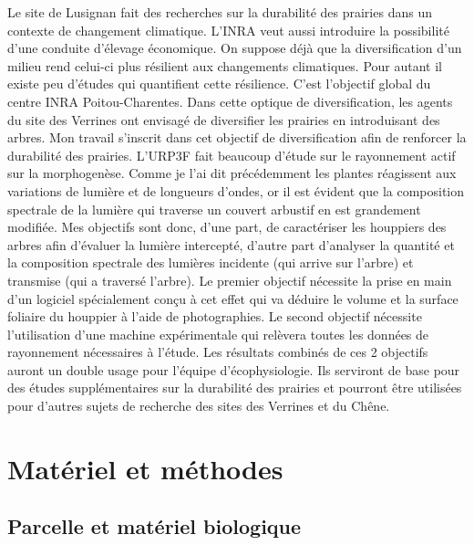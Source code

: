 ﻿\documentclass[12pt]{report}
\begin{document}
Le site de Lusignan fait des recherches sur la durabilité des prairies dans un contexte de changement climatique. L'INRA veut
aussi introduire la possibilité d'une conduite d'élevage économique. On suppose déjà que la diversification d'un milieu rend
celui-ci plus résilient aux changements climatiques. Pour autant il existe peu d'études qui quantifient cette résilience. C'est
l'objectif global du centre INRA Poitou-Charentes. Dans cette optique de diversification, les agents du site des Verrines ont
envisagé de diversifier les prairies en introduisant des arbres. Mon travail s'inscrit dans cet objectif de diversification afin
de renforcer la durabilité des prairies. L'URP3F fait beaucoup d'étude sur le rayonnement actif sur la morphogenèse. Comme je l'ai
dit précédemment les plantes réagissent aux variations de lumière et de longueurs d'ondes, or il est évident que la
composition spectrale de la lumière qui traverse un couvert arbustif en est grandement modifiée. Mes objectifs sont donc, d'une
part, de caractériser les houppiers des arbres afin d'évaluer la lumière intercepté, d'autre part d'analyser la quantité et la composition spectrale des lumières
incidente (qui arrive sur l'arbre) et transmise (qui a traversé l'arbre). Le premier objectif nécessite la prise en main
d'un logiciel spécialement conçu à cet effet qui va déduire le volume et la surface foliaire du houppier à l'aide de photographies.
Le second objectif nécessite l'utilisation d'une machine expérimentale qui
relèvera toutes les données de rayonnement nécessaires à l'étude. Les résultats
combinés de ces 2 objectifs auront un double usage pour l'équipe d'écophysiologie.
Ils serviront de base pour des études supplémentaires sur la durabilité des prairies
et pourront être utilisées pour d'autres sujets de recherche des sites des
Verrines et du Chêne.

\chapter{Matériel et méthodes}

\section{Parcelle et matériel biologique}
\end{document}
